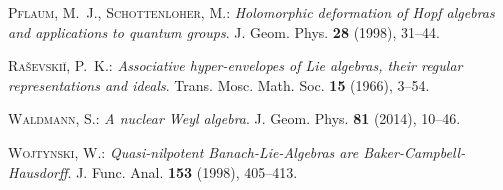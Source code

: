 \documentclass[
11pt,                          %
english                        %
]{article}
\begin{document}
\begin{thebibliography}{1}
\textsc{Pflaum, M.~J., Schottenloher, M.: }\newblock \emph{Holomorphic
  deformation of Hopf algebras and applications to quantum groups}.
\newblock J. Geom. Phys.  \textbf{28} (1998), 31--44.

\textsc{Ra{\v{s}}evski{\u{i}}, P.~K.: }\newblock \emph{Associative
  hyper-envelopes of Lie algebras, their regular representations and ideals}.
\newblock Trans. Mosc. Math. Soc.  \textbf{15} (1966), 3--54.

\textsc{Waldmann, S.: }\newblock \emph{A nuclear Weyl algebra}.
\newblock J. Geom. Phys.  \textbf{81} (2014), 10--46.

\textsc{Wojtynski, W.: }\newblock \emph{Quasi-nilpotent 
{B}anach-{L}ie-Algebras are {B}aker-{C}ampbell-{H}ausdorff}.
\newblock J. Func. Anal.  \textbf{153} (1998), 405--413.

\end{thebibliography}



\end{document}
